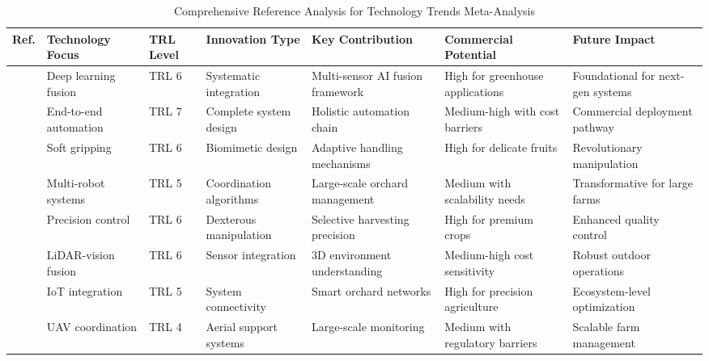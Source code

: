 \documentclass[a4paper,fleqn]{cas-dc}
\begin{document}
\begin{table}[htbp]
\centering
\footnotesize
\caption{Comprehensive Reference Analysis for Technology Trends Meta-Analysis}
\label{tab:technology_trends_refs}
\begin{tabular}{p{}p{}p{}p{}p{}p{}p{}}
\toprule
\textbf{Ref.} & \textbf{Technology Focus} & \textbf{TRL Level} & \textbf{Innovation Type} & \textbf{Key Contribution} & \textbf{Commercial Potential} & \textbf{Future Impact} \\ \midrule

\cite{hou2023overview} & Deep learning fusion & TRL 6 & Systematic integration & Multi-sensor AI fusion framework & High for greenhouse applications & Foundational for next-gen systems \\

\cite{zhang2024automatic} & End-to-end automation & TRL 7 & Complete system design & Holistic automation chain & Medium-high with cost barriers & Commercial deployment pathway \\

\cite{navas2021soft} & Soft gripping & TRL 6 & Biomimetic design & Adaptive handling mechanisms & High for delicate fruits & Revolutionary manipulation \\

\cite{mingyou2024orchard} & Multi-robot systems & TRL 5 & Coordination algorithms & Large-scale orchard management & Medium with scalability needs & Transformative for large farms \\

\cite{rajendran2024towards} & Precision control & TRL 6 & Dexterous manipulation & Selective harvesting precision & High for premium crops & Enhanced quality control \\

\cite{liu2024hierarchical} & LiDAR-vision fusion & TRL 6 & Sensor integration & 3D environment understanding & Medium-high cost sensitivity & Robust outdoor operations \\

\cite{mohamed2021smart} & IoT integration & TRL 5 & System connectivity & Smart orchard networks & High for precision agriculture & Ecosystem-level optimization \\

\cite{martos2021ensuring} & UAV coordination & TRL 4 & Aerial support systems & Large-scale monitoring & Medium with regulatory barriers & Scalable farm management \\


\end{tabular}
\end{table}
\end{document}
